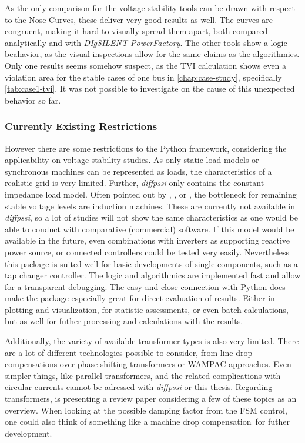 As the only comparison for the voltage stability tools can be drawn with respect to the Nose Curves, these deliver very good results as well.
The curves are congruent, making it hard to visually spread them apart, both compared analytically and with \textit{DIgSILENT PowerFactory}.
The other tools show a logic beahavior, as the visual inspections allow for the same claims as the algorithmics.
Only one results seems somehow suspect, as the \acs{TVI} calculation shows even a violation area for the stable cases of one bus in \autoref{chap:case-study}, specifically \autoref{tab:case1-tvi}.
It was not possible to investigate on the cause of this unexpected behavior so far.

\subsubsection{Currently Existing Restrictions}

However there are some restrictions to the Python framework, considering the applicability on voltage stability studies.
As only static load models or synchronous machines can be represented as loads, the characteristics of a realistic grid is very limited.
Further, \textit{diffpssi} only contains the constant impedance load model.
Often pointed out by \textcite{cutsem_1998}, \textcite{kundur_2022}, or \textcite{danish_2015}, the bottleneck for remaining stable voltage levels are induction machines.
These are currently not available in \textit{diffpssi}, so a lot of studies will not show the same characteristics as one would be able to conduct with comparative (commercial) software.
If this model would be available in the future, even combinations with inverters as supporting reactive power source, or connected controllers could be tested very easily.
Nevertheless this package is suited well for basic developments of single components, such as a tap changer controller.
The logic and algorithmics are implemented fast and allow for a transparent debugging.
The easy and close connection with Python does make the package especially great for direct evaluation of results.
Either in plotting and visualization, for statistic assessments, or even batch calculations, but as well for futher processing and calculations with the results. 

Additionally, the variety of available transformer types is also very limited.
There are a lot of different technologies possible to consider, from line drop compensations over phase shifting transformers or \ac{WAMPAC} approaches.
Even simpler things, like parallel transformers, and the related complications with circular currents cannot be adressed with \textit{diffpssi} or this thesis.
Regarding transformers, \textcite{sarimuthu_2016} is presenting a review paper considering a few of these topics as an overview.
When looking at the possible damping factor from the \acs{FSM} control, one could also think of something like a \glqq machine drop compensation\grqq~for futher development.

